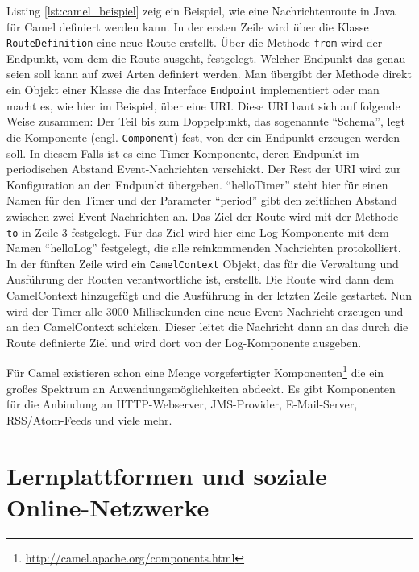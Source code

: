 Listing \ref{lst:camel_beispiel} zeig ein Beispiel, wie eine Nachrichtenroute in Java für Camel definiert werden kann. In der ersten Zeile wird über die Klasse \texttt{RouteDefinition} eine neue Route erstellt. Über die Methode \texttt{from} wird der Endpunkt, vom dem die Route ausgeht, festgelegt. Welcher Endpunkt das genau seien soll kann auf zwei Arten definiert werden. Man übergibt der Methode direkt ein Objekt einer Klasse die das Interface \texttt{Endpoint} implementiert oder man macht es, wie hier im Beispiel, über eine URI. Diese URI baut sich auf folgende Weise zusammen: Der Teil bis zum Doppelpunkt, das sogenannte \enquote{Schema}, legt die Komponente (engl. \texttt{Component}) fest, von der ein Endpunkt erzeugen werden soll. In diesem Falls ist es eine Timer-Komponente, deren Endpunkt im periodischen Abstand Event-Nachrichten verschickt. Der Rest der URI wird zur Konfiguration an den Endpunkt übergeben. \enquote{helloTimer} steht hier für einen Namen für den Timer und der Parameter \enquote{period} gibt den zeitlichen Abstand zwischen zwei Event-Nachrichten an. Das Ziel der Route wird mit der Methode \texttt{to} in Zeile 3 festgelegt. Für das Ziel wird hier eine Log-Komponente mit dem Namen \enquote{helloLog} festgelegt, die alle reinkommenden Nachrichten protokolliert. In der fünften Zeile wird ein \texttt{CamelContext} Objekt, das für die Verwaltung und Ausführung der Routen verantwortliche ist, erstellt. Die Route wird dann dem CamelContext hinzugefügt und die Ausführung in der letzten Zeile gestartet. Nun wird der Timer alle 3000 Millisekunden eine neue Event-Nachricht erzeugen und an den CamelContext schicken. Dieser leitet die Nachricht dann an das durch die Route definierte Ziel und wird dort von der Log-Komponente ausgeben.

Für Camel existieren schon eine Menge vorgefertigter Komponenten\footnote{\url{http://camel.apache.org/components.html}} die ein großes Spektrum an Anwendungsmöglichkeiten abdeckt. Es gibt Komponenten für die Anbindung an HTTP-Webserver, JMS-Provider, E-Mail-Server, RSS/Atom-Feeds und viele mehr. 




\section{Lernplattformen und soziale Online-Netzwerke} %
\label{sec:lernplattformen_und_soziale_online_netzwerke}

